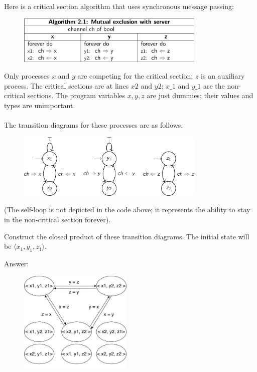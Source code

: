 \documentclass{article}
\begin{document}
\setcounter{question}{0}

\begin{Question} 
Here is a critical section algorithm that uses synchronous message passing:
\begin{figure}[H]
    \centering 
    \includegraphics[width=0.8\textwidth]{DV_demand1}
\end{figure}
Only processes $x$ and $y$ are competing for the critical section; $z$ is an auxiliary process. The critical sections are at lines $x2$ and $y2$; $x\_1$ and $y\_1$ are the non-critical sections. The program variables $x,y,z$ are just dummies; their values and types are unimportant.\\\\
The transition diagrams for these processes are as follows.
\begin{figure}[H]
    \centering 
    \includegraphics[width=0.8\textwidth]{DV_demand2}
\end{figure}
(The self-loop is not depicted in the code above; it represents the ability to stay in the non-critical section forever).


\begin{Subquestion}
    Construct the closed product of these transition diagrams. The initial state will be $\langle x_1,y_1,z_1 \rangle$.
\begin{answer}
    Answer:
    \begin{figure}[H]
        \centering
        \includegraphics[width=0.48\textwidth]{DV_demand3}
    \end{figure}
\end{answer}
\end{Subquestion}



\end{Question}
\end{document}
